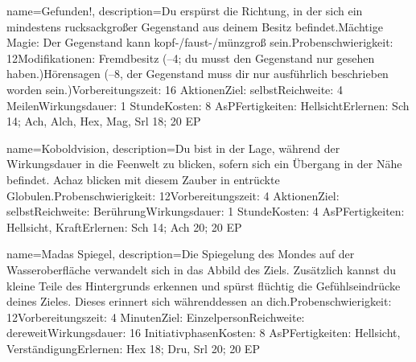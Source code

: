 {
    name={Gefunden!},
    description={Du erspürst die Richtung, in der sich ein mindestens rucksackgroßer Gegenstand aus deinem Besitz befindet.\newline Mächtige Magie: Der Gegenstand kann kopf-/faust-/münzgroß sein.\newline Probenschwierigkeit: 12\newline Modifikationen: Fremdbesitz (–4; du musst den Gegenstand nur gesehen haben.)\newline Hörensagen (–8, der Gegenstand muss dir nur ausführlich beschrieben worden sein.)\newline Vorbereitungszeit: 16 Aktionen\newline Ziel: selbst\newline Reichweite: 4 Meilen\newline Wirkungsdauer: 1 Stunde\newline Kosten: 8 AsP\newline Fertigkeiten: Hellsicht\newline Erlernen: Sch 14; Ach, Alch, Hex, Mag, Srl 18; 20 EP}
}


{
    name={Koboldvision},
    description={Du bist in der Lage, während der Wirkungsdauer in die Feenwelt zu blicken, sofern sich ein Übergang in der Nähe befindet. Achaz blicken mit diesem Zauber in entrückte Globulen.\newline Probenschwierigkeit: 12\newline Vorbereitungszeit: 4 Aktionen\newline Ziel: selbst\newline Reichweite: Berührung\newline Wirkungsdauer: 1 Stunde\newline Kosten: 4 AsP\newline Fertigkeiten: Hellsicht, Kraft\newline Erlernen: Sch 14; Ach 20; 20 EP}
}


{
    name={Madas Spiegel},
    description={Die Spiegelung des Mondes auf der Wasseroberfläche verwandelt sich in das Abbild des Ziels. Zusätzlich kannst du kleine Teile des Hintergrunds erkennen und spürst flüchtig die Gefühlseindrücke deines Zieles. Dieses erinnert sich währenddessen an dich.\newline Probenschwierigkeit: 12\newline Vorbereitungszeit: 4 Minuten\newline Ziel: Einzelperson\newline Reichweite: dereweit\newline Wirkungsdauer: 16 Initiativphasen\newline Kosten: 8 AsP\newline Fertigkeiten: Hellsicht, Verständigung\newline Erlernen: Hex 18; Dru, Srl 20; 20 EP}
}


